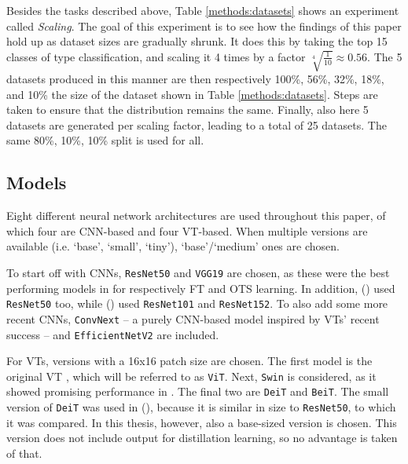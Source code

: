 Besides the tasks described above, Table \ref{methods:datasets} shows an experiment called \textit{Scaling}. The goal of this experiment is to see how the findings of this paper hold up as dataset sizes are gradually shrunk. It does this by taking the top 15 classes of type classification, and scaling it 4 times by a factor $\sqrt[4]{\frac{1}{10}} \approx 0.56$. The 5 datasets produced in this manner are then respectively 100\%, 56\%, 32\%, 18\%, and 10\% the size of the dataset shown in Table \ref{methods:datasets}. Steps are taken to ensure that the distribution remains the same. Finally, also here 5 datasets are generated per scaling factor, leading to a total of 25 datasets. The same 80\%, 10\%, 10\% split is used for all.


\subsection{Models} \label{methods:models}
Eight different neural network architectures are used throughout this paper, of which four are CNN-based and four VT-based. When multiple versions are available (i.e. `base', `small', `tiny'), `base'/`medium' ones are chosen.

To start off with CNNs, \texttt{ResNet50} \citep{he2016deep} and \texttt{VGG19} \citep{simonyan2014very} are chosen, as these were the best performing models in \citeauthor{sabatelli2018deep} for respectively FT and OTS learning. In addition, \citeauthor{matsoukas2021time} (\citeyear{matsoukas2021time}) used \texttt{ResNet50} too, while \citeauthor{zhou2021convnets} (\citeyear{zhou2021convnets}) used \texttt{ResNet101} and \texttt{ResNet152}. To also add some more recent CNNs, \texttt{ConvNext} \citep{liu2022convnet} -- a purely CNN-based model inspired by VTs' recent success -- and \texttt{EfficientNetV2} \citep{tan2021efficientnetv2} are included.

For VTs, versions with a 16x16 patch size are chosen. The first model is the original VT \citep{dosovitskiy2020image}, which will be referred to as \texttt{ViT}. Next, \texttt{Swin} \citep{liu2021swin} is considered, as it showed promising performance in \citeauthor{zhou2021convnets}. The final two are \texttt{DeiT} and \texttt{BeiT}. The small version of \texttt{DeiT} was used in \citeauthor{matsoukas2021time} (\citeyear{matsoukas2021time}), because it is similar in size to \texttt{ResNet50}, to which it was compared. In this thesis, however, also a base-sized version is chosen. This version does not include output for distillation learning, so no advantage is taken of that.

